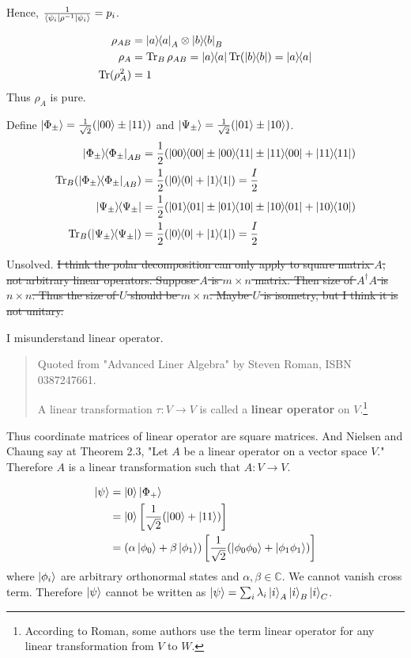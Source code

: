 Hence, $ \frac{1}{\braket{\psi_i | \rho^{-1} | \psi_i}} = p_i $.


\begin{align*}
	\rho_{AB} &= \ket{a}\hspace{-1mm} \bra{a}_A \otimes \ket{b}\hspace{-1mm} \bra{b}_B\\
	\rho_A &= \operatorname{Tr}_{B} \rho_{AB} = \ket{a}\hspace{-1mm} \bra{a} \operatorname{Tr} (\ket{b}\hspace{-1mm} \bra{b}) = \ket{a}\hspace{-1mm} \bra{a}\\
	\operatorname{Tr} (\rho_A^2) &= 1
\end{align*}
Thus $\rho_A$ is pure.


Define $\ket{\Phi_\pm} = \frac{1}{\sqrt{2}} (\ket{00} \pm \ket{11})$ and $\ket{\Psi_\pm} = \frac{1}{\sqrt{2}} (\ket{01} \pm \ket{10})$.
\begin{align*}
	\kb{\Phi_\pm}_{AB} &= \frac{1}{2} (\kb{00} \pm \kbt{00}{11} \pm \kbt{11}{00} + \kb{11})\\
	\Tr_B (\kb{\Phi_\pm}_{AB}) &= \frac{1}{2} (\kb{0} + \kb{1}) = \frac{I}{2}\\
%
	\kb{\Psi_\pm} &= \frac{1}{2} (\kb{01} \pm \kbt{01}{10} \pm \kbt{10}{01} + \kb{10})\\
	\Tr_B (\kb{\Psi_\pm}) &= \frac{1}{2} (\kb{0} + \kb{1}) = \frac{I}{2}
\end{align*}



Unsolved. \sout{I think the polar decomposition can only apply to square matrix $A$, not arbitrary linear operators.
Suppose $A$ is $m \times n$ matrix. Then size of $A^\dagger A$ is $n \times n$. Thus the size of $U$ should be $m \times n$.
Maybe $U$ is isometry, but I think it is not unitary.}

I misunderstand linear operator.
\begin{quote}
	Quoted from "Advanced Liner Algebra" by Steven Roman, ISBN 0387247661.

	A linear transformation $\tau : V \rightarrow V$ is called a \textbf{linear operator} on $V$.\footnote{According to Roman, some authors use the term linear operator for any linear transformation from $V$ to $W$.}
\end{quote}
Thus coordinate matrices of linear operator are square matrices. And Nielsen and Chaung say at Theorem 2.3, "Let $A$ be a linear operator on a vector space $V$." Therefore $A$ is a linear transformation such that $A : V \rightarrow V$.

\begin{align*}
	\ket{\psi}  &=  \ket{0}  \ket{\Phi_+}\\
		&= \ket{0} \left[\frac{1}{\sqrt{2}}(\ket{00} + \ket{11})\right]\\
		&= (\alpha \ket{\phi_0} + \beta \ket{\phi_1})  \left[\frac{1}{\sqrt{2}}(\ket{\phi_0 \phi_0} + \ket{\phi_1 \phi_1})\right]\\
\end{align*}
where $\ket{\phi_i}$ are arbitrary orthonormal states and $\alpha, \beta \in \mathds{C}$.
We cannot vanish cross term. Therefore $\ket{\psi}$ cannot be written as $\ket{\psi} = \sum_i \lambda_i \ket{i}_A \ket{i}_B \ket{i}_C$.


